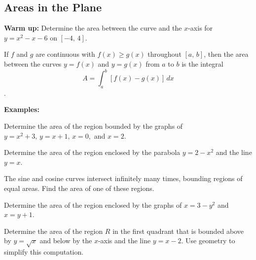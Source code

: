\subsection*{Areas in the Plane}
\textbf{Warm up:} Determine the area between the curve and the $x$-axis for $y=x^2-x-6$ on $[-4,\,4].$

\begin{tcolorbox}[title= AREA IN THE PLANE,colframe=black,sharp corners,colback=white,colbacktitle=white,coltitle=black,boxrule=1pt]

     If $f$ and $g$ are continuous with $f(x)\ge g(x)$ throughout $[a,\,b]$, then the area between the curves $y=f(x)$ and $y=g(x)$ from $a$ to $b$ is the integral
     \[A=\int_a^b\left[f(x)-g(x)\right]\,dx\].
    
\end{tcolorbox}

\textbf{Examples:}
\begin{questions}
    \question Determine the area of the region bounded by the graphs of $y=x^2+3,\,y=x+1,\,x=0,$ and $x=2$.
    
    \question Determine the area of the region enclosed by the parabola $y=2-x^2$ and the line $y=x$.
    
    \newpage
    
    \question The sine and cosine curves intersect infinitely many times, bounding regions of equal areas. Find the area of one of these regions.
    
    \question Determine the area of the region enclosed by the graphs of $x=3-y^2$ and $x=y+1$.
    
    \question Determine the area of the region $R$ in the first quadrant that is bounded above by $y=\sqrt{x}$ and below by the $x$-axis and the line $y=x-2$. Use geometry to simplify this computation.
\end{questions}



\newpage

